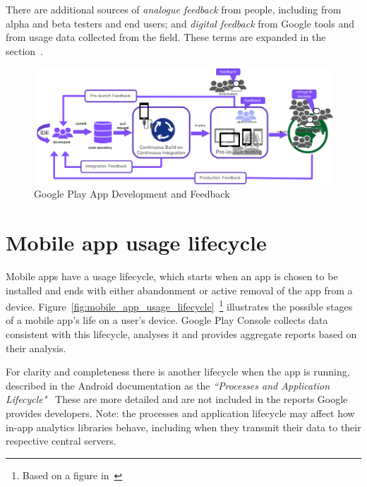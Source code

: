 There are additional sources of \emph{analogue feedback} from people, including from alpha and beta testers and end users; and \emph{digital feedback} from Google tools and from usage data collected from the field. These terms are expanded in the section~\href{analogue-and-digital-feedback}{\emph{}}.

\begin{figure}[htbp!]
    \centering
    \includegraphics[width=13cm]{images/google-play-app-development.png}
    \caption{Google Play App Development and Feedback}
    \label{fig:google-play-app-development-and-feedback}
\end{figure}

\section{Mobile app usage lifecycle}
Mobile apps have a usage lifecycle, which starts when an app is chosen to be installed and ends with either abandonment or active removal of the app from a device. Figure~\ref{fig:mobile_app_usage_lifecycle}~\footnote{Based on a figure in~\cite{bohmer2011falling_asleep_with_angry_birds}} illustrates the possible stages of a mobile app's life on a user's device. Google Play Console collects data consistent with this lifecycle, analyses it and provides aggregate reports based on their analysis. 

For clarity and completeness there is another lifecycle when the app is running, described in the Android documentation as the \emph{``Processes and Application Lifecycle"}~\cite{android_processes_and_application_lifecycle} These are more detailed and are not included in the reports Google provides developers. %
Note: the processes and application lifecycle may affect how in-app analytics libraries behave, including when they transmit their data to their respective central servers.



